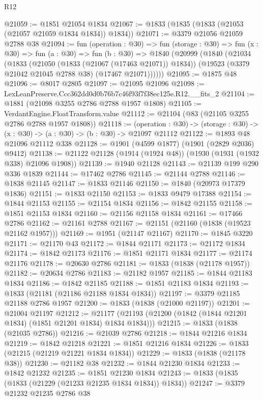 \begin{lexlean}{R12}
\begin{coremodule}
@21059 := @1851 @21054 @1834
@21067 := @1833 (@1835 (@1833 (@21053 (@21057 @21059 @1834 @1834)) @1834))
@21071 := @3379 @21056 @21059 @2788 @38
@21094 := fun (operation : @30) =>
  fun (storage : @30) =>
  fun (x : @30) =>
  fun (a : @30) =>
  fun (b : @30) =>
  @1840
    (@20999
      (@1840
        (@21034
          (@1833
            (@21050 (@1833 (@21067 (@17463 @21071)) @1834))
            (@19523 (@3379 @21042 @21045 @2788 @38) (@17467 @21071))))))
@21095 := @1875 @48
@21096 := @8017 @2805
@21097 := @21095 @21096
@21098 := LexLeanPreserve.Ccc362dd0d0b76b7c46f93f7f38ec125e.R12.__fits_2
@21104 := @1881 (@21098 @3255 @2786 @2788 @1957 @1808)
@21105 := VerdantEngine.FloatTransform.value
@21112 := @21104 (@83 (@21105 @3255 @2786 @2788 @1957 @1808))
@21118 := (operation : @30) ->
  (storage : @30) -> (x : @30) -> (a : @30) -> (b : @30) -> @21097 @21112
@21122 := @1893 @48 @21096 @21112 @338
@21128 := @1901 (@4599 @1877) (@1901 (@2829 @2036) @9412)
@21138 := @21122 @21128 (@1914 (@1924 @48)) (@1930 (@1931 (@1932 @338) @21096 @1908))
@21139 := @1940 @21128
@21143 := @21139 @199 @290 @336 @1839
@21144 := @17462 @2786
@21145 := @21144 @2788
@21146 := @1838 @21145
@21147 := @1833 @21146
@21150 := @1840 (@20973 @17379 @1836)
@21151 := @1833 @21150
@21153 := @1833 @9479 @17388
@21154 := @1844 @21153
@21155 := @21154 @1834
@21156 := @1842 @21155
@21158 := @1851 @21153 @1834
@21160 := @21156 @21158 @1834
@21161 := @17466 @2786
@21162 := @21161 @2788
@21167 := @21151 (@21160 (@1838 (@19523 @21162 @1957)))
@21169 := @1951 (@21147 @21167)
@21170 := @1845 @3220
@21171 := @21170 @43
@21172 := @1844 @21171
@21173 := @21172 @1834
@21174 := @1842 @21173
@21176 := @1851 @21171 @1834
@21177 := @21174 @21176
@21178 := @20630 @2786
@21181 := @1833 (@1838 (@21178 @1957))
@21182 := @20634 @2786
@21183 := @21182 @1957
@21185 := @1844 @21183 @1834
@21186 := @1842 @21185
@21188 := @1851 @21183 @1834
@21193 := @1833 (@21181 (@21186 @21188 @1834 @1834))
@21197 := @3379 @21185 @21188 @2786 @1957
@21200 := @1833 (@1838 (@21000 @21197))
@21201 := @21004 @21197
@21212 := @21177 (@21193 (@21200 (@1842 (@1844 @21201 @1834) (@1851 @21201 @1834) @1834 @1834)))
@21215 := @1833 (@1838 (@21035 @2786))
@21216 := @21039 @2786
@21218 := @1844 @21216 @1834
@21219 := @1842 @21218
@21221 := @1851 @21216 @1834
@21226 := @1833 (@21215 (@21219 @21221 @1834 @1834))
@21229 := @1833 (@1838 (@21178 @38))
@21230 := @21182 @38
@21232 := @1844 @21230 @1834
@21233 := @1842 @21232
@21235 := @1851 @21230 @1834
@21243 := @1833 (@1835 (@1833 (@21229 (@21233 @21235 @1834 @1834)) @1834))
@21247 := @3379 @21232 @21235 @2786 @38

\end{coremodule}
\end{lexlean}
